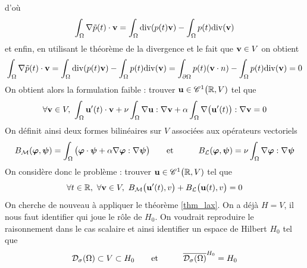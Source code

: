 d'où
\begin{equation*}
    \int_{\Omega} \nabla \tilde{p}(t) \cdot \bm{\mathrm{v}} = \int_{\Omega}\mathrm{div}(p(t)\bm{\mathrm{v}}) - \int_{\Omega} p(t)\mathrm{div}(\bm{\mathrm{v}})
\end{equation*}
et enfin, en utilisant le théorème de la divergence et le fait que $\bm{\mathrm{v}} \in V$ on obtient 
\begin{equation*}
    \int_{\Omega} \nabla \tilde{p}(t) \cdot \bm{\mathrm{v}} = \int_{\Omega}\mathrm{div}(p(t)\bm{\mathrm{v}}) - \int_{\Omega} p(t)\mathrm{div}(\bm{\mathrm{v}}) = \int_{\partial \Omega} p(t)(\bm{\mathrm{v}} \cdot n) - \int_{\Omega} p(t)\mathrm{div}(\bm{\mathrm{v}}) = 0
\end{equation*}
On obtient alors la formulation faible : trouver $\bm{\mathrm{u}} \in \mathscr{C}^1\big(\mathbb{R}, V)$ tel que 
\begin{equation*}
    \forall \bm{\mathrm{v}} \in V, \ \int_{\Omega}\bm{\mathrm{u}}'(t) \cdot \bm{\mathrm{v}} + \nu \int_{\Omega} \nabla \bm{\mathrm{u}} : \nabla \bm{\mathrm{v}} + \alpha \int_{\Omega} \nabla \big(\bm{\mathrm{u}}'(t)\big) : \nabla \bm{\mathrm{v}} = 0
\end{equation*} 
On définit ainsi deux formes bilinéaires sur $V$ associées aux opérateurs vectoriels 
\begin{eqnarray*}
    B_{\mathcal{M}}(\bm{\mathrm{\varphi}}, \bm{\mathrm{\psi}}) = \int_{\Omega} \big(\bm{\mathrm{\varphi}}\cdot\bm{\mathrm{\psi}}+\alpha\nabla \bm{\mathrm{\varphi}} : \nabla \bm{\mathrm{\psi}}\big) \ \ \ \ \ &\text{ et }& \ \ \ \ \
    B_{\mathcal{L}}(\bm{\mathrm{\varphi}}, \bm{\mathrm{\psi}}) = \nu\int_{\Omega} \nabla \bm{\mathrm{\varphi}} : \nabla \bm{\mathrm{\psi}}
\end{eqnarray*}
On considère donc le problème  : trouver $\bm{\mathrm{u}} \in \mathscr{C}^1\big(\mathbb{R}, V)$ tel que 
\begin{equation}\label{formulation_faible_vectorielle}
    \forall t \in \bbR, \ \forall \bfm{v} \in V, \ B_{\calM}\big(\bfm{u}'(t), v\big) + B_{\calL}\big(\bfm{u}(t),v\big) = 0
\end{equation}
On cherche de nouveau à appliquer le théorème \ref{thm_lax}. On a déjà
$H=V$, il nous faut identifier qui joue le rôle de $H_0$. On voudrait reproduire le raisonnement dans le cas scalaire et ainsi identifier un espace 
de Hilbert $H_0$ tel que 
\begin{eqnarray*}
    \mathcal{D}_{\sigma}(\Omega) \subset V \subset H_0 \ \ \ \ \ &\text{ et }&
    \ \ \ \ \ \overline{\mathcal{D}_{\sigma}(\Omega)}^{H_0} = H_0
\end{eqnarray*}
